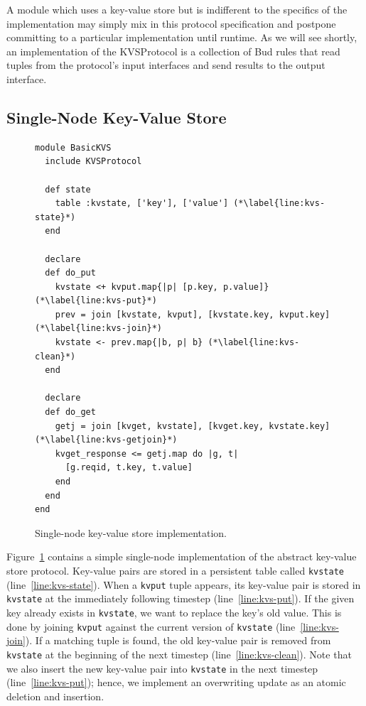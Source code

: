A module which uses a key-value store but is indifferent to the specifics of the
implementation may simply mix in this protocol specification and postpone
committing to a particular implementation until runtime. As we will see shortly,
an implementation of the KVSProtocol is a collection of Bud rules that read
tuples from the protocol's input interfaces and send results to the output
interface.

\subsection{Single-Node Key-Value Store}
\label{sec:simple-kvs}
\begin{figure}[t]
\begin{scriptsize}
\begin{lstlisting}
module BasicKVS
  include KVSProtocol

  def state
    table :kvstate, ['key'], ['value'] (*\label{line:kvs-state}*)
  end

  declare
  def do_put
    kvstate <+ kvput.map{|p| [p.key, p.value]} (*\label{line:kvs-put}*)
    prev = join [kvstate, kvput], [kvstate.key, kvput.key] (*\label{line:kvs-join}*)
    kvstate <- prev.map{|b, p| b} (*\label{line:kvs-clean}*)
  end

  declare
  def do_get
    getj = join [kvget, kvstate], [kvget.key, kvstate.key] (*\label{line:kvs-getjoin}*)
    kvget_response <= getj.map do |g, t|
      [g.reqid, t.key, t.value]
    end
  end
end
\end{lstlisting}
\centering
\vspace{-10pt}
\caption{Single-node key-value store implementation.}
\label{fig:kvs-impl}
\end{scriptsize}
\vspace{-2pt}
\end{figure}

Figure~\ref{fig:kvs-impl} contains a simple single-node implementation of the
abstract key-value store protocol. Key-value pairs are stored in a persistent
table called \texttt{kvstate} (line~\ref{line:kvs-state}). When a \texttt{kvput}
tuple appears, its key-value pair is stored in \texttt{kvstate} at the immediately
following timestep (line~\ref{line:kvs-put}).  If the given key already exists in
\texttt{kvstate}, we want to replace the key's old value. This is done by
joining \texttt{kvput} against the current version of \texttt{kvstate}
(line~\ref{line:kvs-join}). If a matching tuple is found, the old key-value pair
is removed from \texttt{kvstate} at the beginning of the next timestep
(line~\ref{line:kvs-clean}). Note that we also insert the new key-value pair
into \texttt{kvstate} in the next timestep (line~\ref{line:kvs-put});
hence, we implement an overwriting update as an atomic deletion and insertion.

